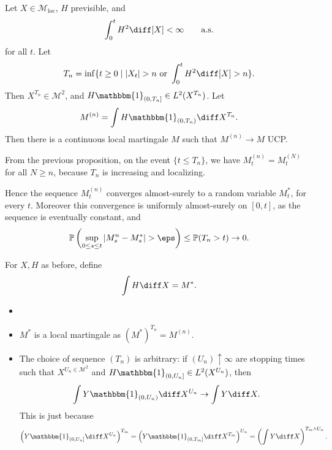 \documentclass[12pt]{article}
\begin{document}

\begin{proposition}
	Let $X \in \mathcal{M}_{\mathrm{loc}}$, $H$ previsible, and
	\[
		\int_0^{t} H^2 \diff [X] < \infty \qquad\text{a.s.}
	\]
	for all $t$. Let 
	\[
		T_n = \inf \{t \geq 0 \mid |X_t| > n \text{ or } \int_0^{t} H^2 \diff [X] > n\}.
	\]
	Then $X^{T_n} \in \mathcal{M}^2$, and $H \mathbbm{1}_{(0, T_n]} \in L^2(X^{T_n})$. Let
	\[
	M^{(n)} = \int H \mathbbm{1}_{(0, T_n)} \diff X^{T_n}.
	\]
	Then there is a continuous local martingale $M$ such that $M^{(n)} \to M$ UCP.
\end{proposition}

\begin{proofbox}
	From the previous proposition, on the event $\{t \leq T_n\}$, we have $M_t^{(n)} = M_t^{(N)}$ for all $N \geq n$, because $T_n$ is increasing and localizing.

	Hence the sequence $M_t^{(n)}$ converges almost-surely to a random variable $M_t^{\ast}$, for every $t$. Moreover this convergence is uniformly almost-surely on $[0, t]$, as the sequence is eventually constant, and
	\[
	\mathbb{P}\left( \sup_{0 \leq s \leq t}|M_s^{n} - M_s^{\ast}| > \eps \right) \leq \mathbb{P}(T_n > t) \to 0.
	\]
\end{proofbox}

\begin{definition}
	For $X, H$ as before, define
	\[
	\int H \diff X = M^{\ast}.
	\]
\end{definition}

\begin{remark}
	\begin{itemize}
		\item[]
		\item $M^{\ast}$ is a local martingale as $(M^{\ast})^{T_n} = M^{(n)}$.
		\item The choice of sequence $(T_n)$ is arbitrary: if $(U_n) \uparrow \infty$ are stopping times such that $X^{U_n \in \mathcal{M}^2}$ and $H \mathbbm{1}_{(0, U_n]} \in L^2(X^{U_n})$, then
			\[
			\int Y \mathbbm{1}_{(0, U_n)} \diff X^{U_n} \to \int Y \diff X.
			\]
			This is just because
			\begin{align*}
				\left( Y \mathbbm{1}_{(0, U_n]} \diff X^{U_n} \right)^{T_m} = \left( Y \mathbbm{1}_{(0, T_m]} \diff X^{T_m} \right)^{U_n} = \left( \int Y \diff X \right)^{T_m \wedge U_n}.
			\end{align*}
	\end{itemize}
\end{remark}
\end{document}
